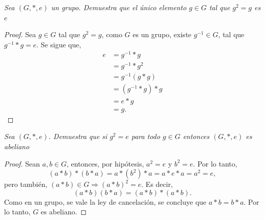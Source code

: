 \documentclass[11pt,letterpaper]{article}
\begin{document}
\begin{tcolorbox}[
	title = \textcolor{black}{\textcolor{white}{Problema 2}},]
\textit{Sea $(G,*,e)$ un grupo. Demuestra que el \'unico elemento $g\in G$ tal que $g^2=g$ es $e$
}
\end{tcolorbox}
\begin{proof}
    Sea \(g\in G\) tal que \(g^2=g\), como \(G\) es un grupo, existe \(g^{-1}\in G\), tal que \(g^{-1}*g=e\). Se sigue que, 
    \begin{align*}
        e&=g^{-1}*g\\ &=g^{-1}*g^2\\ &=g^{-1}(g*g)\\ &=(g^{-1}*g)*g\\ &=e*g\\ &=g.
    \end{align*}
\end{proof}
\begin{tcolorbox}[
	title = \textcolor{black}{\textcolor{white}{Problema 3}},]
\textit{Sea $(G,*,e)$. Demuestra que si $g^2=e$ para todo $g\in G$ entonces $(G,*,e)$ es abeliano}
\end{tcolorbox}
\begin{proof}
    Sean \(a,b \in G\), entonces, por hipótesis, \(a^2=e\) y \(b^2=e\). Por lo tanto,
        \[(a*b)*(b*a)=a*(b^2)*a=a*e*a=a^2=e,\]
        pero también, \((a*b)\in G \Rightarrow (a*b)^2=e\). Es decir,
        \[(a*b)(b*a)=(a*b)*(a*b).\]
        Como en un grupo, se vale la ley de cancelación, se concluye que \(a*b=b*a\). Por lo tanto, \(G\) es abeliano.
\end{proof}
\end{document}
